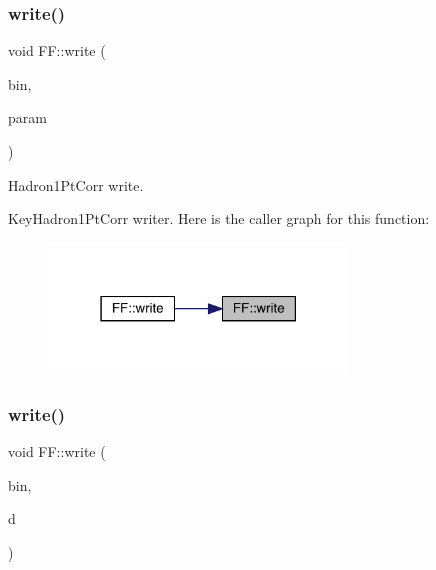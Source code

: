 \subsubsection{\texorpdfstring{write()}{write()}\hspace{0.1cm}{\footnotesize\ttfamily [8/13]}}
{\footnotesize\ttfamily void F\+F\+::write (\begin{DoxyParamCaption}\item[{\mbox{\hyperlink{classADATIO_1_1BinaryWriter}{Binary\+Writer}} \&}]{bin,  }\item[{const \mbox{\hyperlink{structFF_1_1KeyHadron1PtCorr__t}{Key\+Hadron1\+Pt\+Corr\+\_\+t}} \&}]{param }\end{DoxyParamCaption})}



Hadron1\+Pt\+Corr write. 

Key\+Hadron1\+Pt\+Corr writer. Here is the caller graph for this function\+:\nopagebreak
\begin{figure}[H]
\begin{center}
\leavevmode
\includegraphics[width=226pt]{d5/da6/namespaceFF_a78fdf587c961ada1987ee8f443e3d961_icgraph}
\end{center}
\end{figure}
\mbox{\label{namespaceFF_a5c3e38934ee51ae23bc9d39dca34acc1}} 
\subsubsection{\texorpdfstring{write()}{write()}\hspace{0.1cm}{\footnotesize\ttfamily [9/13]}}
{\footnotesize\ttfamily void F\+F\+::write (\begin{DoxyParamCaption}\item[{\mbox{\hyperlink{classADATIO_1_1BinaryWriter}{Binary\+Writer}} \&}]{bin,  }\item[{const \mbox{\hyperlink{structFF_1_1DiscoKeyOperator__t}{Disco\+Key\+Operator\+\_\+t}} \&}]{d }\end{DoxyParamCaption})}



